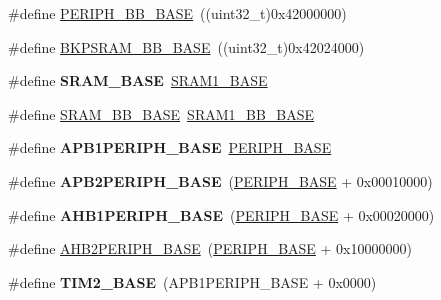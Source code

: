 \begin{DoxyCompactItemize}
\item 
\#define \hyperlink{group___peripheral__memory__map_gaed7efc100877000845c236ccdc9e144a}{P\+E\+R\+I\+P\+H\+\_\+\+B\+B\+\_\+\+B\+A\+SE}~((uint32\+\_\+t)0x42000000)
\item 
\#define \hyperlink{group___peripheral__memory__map_gaee19a30c9fa326bb10b547e4eaf4e250}{B\+K\+P\+S\+R\+A\+M\+\_\+\+B\+B\+\_\+\+B\+A\+SE}~((uint32\+\_\+t)0x42024000)
\item 
\#define {\bfseries S\+R\+A\+M\+\_\+\+B\+A\+SE}~\hyperlink{group___peripheral__memory__map_ga7d0fbfb8894012dbbb96754b95e562cd}{S\+R\+A\+M1\+\_\+\+B\+A\+SE}\hypertarget{group___peripheral__memory__map_ga05e8f3d2e5868754a7cd88614955aecc}{}\label{group___peripheral__memory__map_ga05e8f3d2e5868754a7cd88614955aecc}

\item 
\#define \hyperlink{group___peripheral__memory__map_gad3548b6e2f017f39d399358f3ac98454}{S\+R\+A\+M\+\_\+\+B\+B\+\_\+\+B\+A\+SE}~\hyperlink{group___peripheral__memory__map_gac4c4f61082e4b168f29d9cf97dc3ca5c}{S\+R\+A\+M1\+\_\+\+B\+B\+\_\+\+B\+A\+SE}
\item 
\#define {\bfseries A\+P\+B1\+P\+E\+R\+I\+P\+H\+\_\+\+B\+A\+SE}~\hyperlink{group___peripheral__memory__map_ga9171f49478fa86d932f89e78e73b88b0}{P\+E\+R\+I\+P\+H\+\_\+\+B\+A\+SE}\hypertarget{group___peripheral__memory__map_ga45666d911f39addd4c8c0a0ac3388cfb}{}\label{group___peripheral__memory__map_ga45666d911f39addd4c8c0a0ac3388cfb}

\item 
\#define {\bfseries A\+P\+B2\+P\+E\+R\+I\+P\+H\+\_\+\+B\+A\+SE}~(\hyperlink{group___peripheral__memory__map_ga9171f49478fa86d932f89e78e73b88b0}{P\+E\+R\+I\+P\+H\+\_\+\+B\+A\+SE} + 0x00010000)\hypertarget{group___peripheral__memory__map_ga25b99d6065f1c8f751e78f43ade652cb}{}\label{group___peripheral__memory__map_ga25b99d6065f1c8f751e78f43ade652cb}

\item 
\#define {\bfseries A\+H\+B1\+P\+E\+R\+I\+P\+H\+\_\+\+B\+A\+SE}~(\hyperlink{group___peripheral__memory__map_ga9171f49478fa86d932f89e78e73b88b0}{P\+E\+R\+I\+P\+H\+\_\+\+B\+A\+SE} + 0x00020000)\hypertarget{group___peripheral__memory__map_ga811a9a4ca17f0a50354a9169541d56c4}{}\label{group___peripheral__memory__map_ga811a9a4ca17f0a50354a9169541d56c4}

\item 
\#define \hyperlink{group___peripheral__memory__map_gaeedaa71d22a1948492365e2cd26cfd46}{A\+H\+B2\+P\+E\+R\+I\+P\+H\+\_\+\+B\+A\+SE}~(\hyperlink{group___peripheral__memory__map_ga9171f49478fa86d932f89e78e73b88b0}{P\+E\+R\+I\+P\+H\+\_\+\+B\+A\+SE} + 0x10000000)
\item 
\#define {\bfseries T\+I\+M2\+\_\+\+B\+A\+SE}~(A\+P\+B1\+P\+E\+R\+I\+P\+H\+\_\+\+B\+A\+SE + 0x0000)\hypertarget{group___peripheral__memory__map_ga00d0fe6ad532ab32f0f81cafca8d3aa5}{}\label{group___peripheral__memory__map_ga00d0fe6ad532ab32f0f81cafca8d3aa5}


\end{DoxyCompactItemize}
